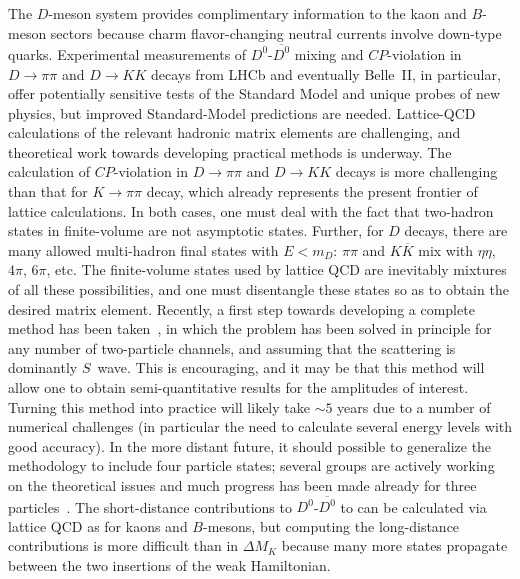 \begin{itemize}
The $D$-meson system provides complimentary information to the kaon and
$B$-meson sectors because charm flavor-changing neutral currents involve
down-type quarks.  Experimental measurements of $D^0$-$\overline{D^0}$ mixing
and $CP$-violation in $D\to\pi\pi$ and $D\to KK$ decays from LHCb and
eventually Belle~II, in particular, offer potentially sensitive tests of the
Standard Model and unique probes of new physics, but improved Standard-Model
predictions are needed.  Lattice-QCD calculations of the relevant hadronic
matrix elements are challenging, and theoretical work towards developing
practical methods is underway.  The calculation of $CP$-violation in
$D\to\pi\pi$ and $D\to KK$ decays is more challenging than that for
$K\to\pi\pi$ decay, which already represents the present frontier of lattice
calculations.  In both cases, one must deal with the fact that two-hadron
states in finite-volume are not asymptotic states.  Further, for $D$ decays,
there are many allowed multi-hadron final states with $E< m_D$: $\pi\pi$ and
$K\overline{K}$ mix with $\eta\eta$, $4\pi$, $6\pi$, etc.  The finite-volume
states used by lattice QCD are inevitably mixtures of all these possibilities,
and one must disentangle these states so as to obtain the desired matrix
element.  Recently, a first step towards developing a complete method has been
taken~\cite{Hansen:2012tf}, in which the problem has been solved in principle
for any number of two-particle channels, and assuming that the scattering is
dominantly $S$~wave.  This is encouraging, and it may be that this method will
allow one to obtain semi-quantitative results for the amplitudes of
interest. Turning this method into practice will likely take $\sim 5$ years
due to a number of numerical challenges (in particular the need to calculate
several energy levels with good accuracy).  In the more distant future, it
should possible to generalize the methodology to include four particle states;
several groups are actively working on the theoretical issues and much
progress has been made already for three
particles~\cite{Polejaeva:2012ut,Briceno:2012rv,Guo:2013qla}.  The
short-distance contributions to $D^0$-$\overline{D^0}$ to can be calculated
via lattice QCD as for kaons and $B$-mesons, but computing the long-distance
contributions is more difficult than in $\Delta M_K$ because many more states
propagate between the two insertions of the weak Hamiltonian.


\end{itemize}
